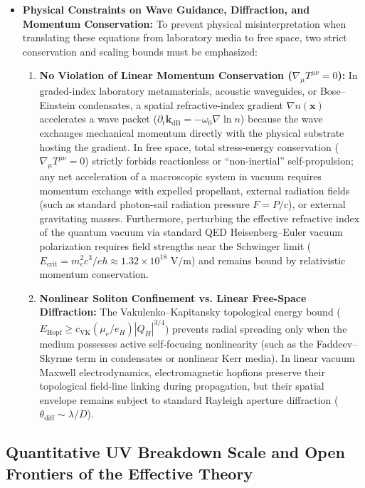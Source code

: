 \documentclass[10pt,aps,prd,twocolumn,superscriptaddress,nofootinbib,floatfix,longbibliography,showkeys]{revtex4-2}
\begin{document}
\begin{itemize}
  \item \textbf{Physical Constraints on Wave Guidance, Diffraction, and Momentum Conservation:} To prevent physical misinterpretation when translating these equations from laboratory media to free space, two strict conservation and scaling bounds must be emphasized:
  \begin{enumerate}
    \item \textbf{No Violation of Linear Momentum Conservation ($\nabla_\mu T^{\mu\nu} = 0$):} In graded-index laboratory metamaterials, acoustic waveguides, or Bose--Einstein condensates, a spatial refractive-index gradient $\nabla n(\mathbf{x})$ accelerates a wave packet ($\partial_t \mathbf{k}_{\text{dB}} = -\omega_0 \nabla\ln n$) because the wave exchanges mechanical momentum directly with the physical substrate hosting the gradient. In free space, total stress-energy conservation ($\nabla_\mu T^{\mu\nu} = 0$) strictly forbids reactionless or ``non-inertial'' self-propulsion; any net acceleration of a macroscopic system in vacuum requires momentum exchange with expelled propellant, external radiation fields (such as standard photon-sail radiation pressure $F = P/c$), or external gravitating masses. Furthermore, perturbing the effective refractive index of the quantum vacuum via standard QED Heisenberg--Euler vacuum polarization requires field strengths near the Schwinger limit ($E_{\text{crit}} = m_e^2 c^3 / e\hbar \approx 1.32 \times 10^{18}\text{ V/m}$) and remains bound by relativistic momentum conservation.
    \item \textbf{Nonlinear Soliton Confinement vs. Linear Free-Space Diffraction:} The Vakulenko--Kapitansky topological energy bound ($E_{\text{Hopf}} \ge c_{\text{VK}}(\mu_e/e_H)|Q_H|^{3/4}$) \cite{ref39,ref40,ref41,ref42} prevents radial spreading only when the medium possesses active self-focusing nonlinearity (such as the Faddeev--Skyrme term in condensates or nonlinear Kerr media). In linear vacuum Maxwell electrodynamics, electromagnetic hopfions preserve their topological field-line linking during propagation, but their spatial envelope remains subject to standard Rayleigh aperture diffraction ($\theta_{\text{diff}} \sim \lambda / D$).

  \end{enumerate}
\end{itemize}

\subsection{Quantitative UV Breakdown Scale and Open Frontiers of the Effective Theory}\label{sec:8.3}
\end{document}
